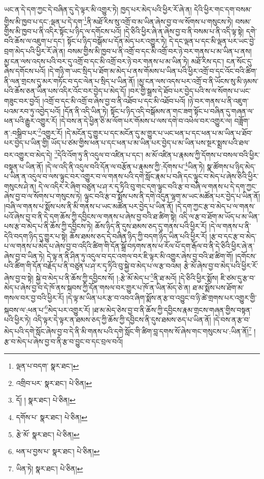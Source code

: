 ཡང་ན་དེ་དག་ཀྱང་དེ་བཞིན་དུ་དེ་ལྟར་མི་འགྱུར་ཏེ། ཁྱད་པར་མེད་པའི་ཕྱིར་རོ་ཞེ་ན། དེའི་ཕྱིར་གང་དག་བསམ་གྱིས་མི་ཁྱབ་པ་དང་:ལྡན་པ་དེ་དག་\footnote{ལྡན་པ་བདག་  སྣར་ཐང་། }ནི་མཐོ་རིས་སུ་འགྲོ་བ་མ་ཡིན་ཞེས་བྱ་བ་ལ་སོགས་པ་གསུངས་ཏེ། བསམ་གྱིས་མི་ཁྱབ་པ་ནི་འདིར་སྟོང་པ་ཉིད་ལ་དགོངས་པའོ། །དེ་ཅིའི་ཕྱིར་ཞེ་ན་ཞེས་བྱ་བ་ནི་བསམ་པ་ནི་འདི་ལྟ་སྟེ། དགེ་བའི་ཆོས་ལ་འཇུག་པ་དང་། སྟོང་པ་ཉིད་བསྒོམ་པ་དོན་མེད་པར་འགྱུར་ཏེ། དེ་དང་ལྡན་པ་དང་མི་ལྡན་པར་ཡང་བྱེ་བྲག་མེད་པའི་ཕྱིར་རོ་ཞེ་ན། བསམ་གྱིས་མི་ཁྱབ་པ་ནི་འགྲོ་བ་དང་མི་འགྲོ་བར་ཉེ་བར་གནས་པ་མ་ཡིན་པ་ནས། མྱ་ངན་ལས་འདས་པའི་བར་དུ་འགྲོ་བ་དང་མི་འགྲོ་བར་ཉེ་བར་གནས་པ་མ་ཡིན་ཏེ། མཐོ་རིས་དང་། ངན་སོང་དུ་ཞེས་དགོངས་པའོ། །དེ་གཉི་ག་ཡང་སྲིད་པ་ཐོག་མ་མེད་པ་ནས་གོམས་པ་ཡིན་པའི་ཕྱིར་འགྲོ་བ་དང་འོང་བའི་ཚིག་ནི་ལན་གྲངས་དུ་མར་གཏོང་བ་དང་ལེན་པ་སྲིད་པ་ཡིན་ནོ། །མྱ་ངན་ལས་འདས་པར་འགྲོ་བ་ནི་ཡོངས་སུ་མི་ཉམས་པའི་ཆོས་ཅན་ཡིན་པས་འདིར་འོང་བར་བྱེད་པ་མེད་དོ། །བར་གྱི་སྒྲས་དེ་ཐོབ་པར་བྱེད་པའི་ས་ལ་སོགས་པ་ཡང་གཟུང་བར་བྱའོ། །འགྲོ་བ་དང་མི་འགྲོ་བ་ཞེས་བྱ་བ་ནི་འཐོབ་པ་དང་མི་འཐོབ་པའོ། །ཉེ་བར་གནས་པ་ནི་འཇུག་པའམ་རབ་ཏུ་འབྱེད་པའོ། །དོན་ནི་འདི་ཡིན་ཏེ། སྟོང་པ་ཉིད་འདི་བསྒོམས་ན་གང་ཟག་སྟོང་པ་བཞིན་དུ་གཞན་ལ་ཕན་པའི་རྒྱུར་འགྱུར་རོ། །དེ་བས་ན་དེ་ཕྱིན་ཅི་མ་ལོག་པར་གོམས་པ་ལས་དགེ་བ་འཕེལ་བར་འགྱུར་ལ། བཟློག་ན་:བསྒྲིབ་པར་\footnote{འགྲིབ་པར་  སྣར་ཐང་།  པེ་ཅིན། }འགྱུར་རོ། །དེ་མངོན་དུ་གྱུར་པ་དང་མངོན་དུ་མ་གྱུར་པ་ཡང་ཕན་པ་དང་ཕན་པ་མ་ཡིན་པ་ཐོབ་པར་བྱེད་པ་ཡིན་གྱི། ཡོད་པ་ཙམ་གྱིས་ཕན་པ་དང་ཕན་པ་མ་ཡིན་པར་བྱེད་པ་མ་ཡིན་པས་སྔར་སྨྲས་པའི་ཐལ་བར་འགྱུར་བ་མེད་དེ། \footnote{དོ། །   སྣར་ཐང་།  པེ་ཅིན། }དེའི་འོག་ཏུ་ནི་འདུལ་བ་འཛིན་པ་དང་། མ་མོ་འཛིན་པ་རྣམས་ཀྱི་དོགས་པ་བསལ་བའི་ཕྱིར་བསྟན་པ་ཡིན་ནོ། །དེ་ལ་འདི་ནི་འདུལ་བའི་དོན་ལ་བརྩོན་པ་རྣམས་ཀྱི་:དོགས་པ་\footnote{དགོས་པ་  སྣར་ཐང་།  པེ་ཅིན། }ཡིན་ཏེ། སྣ་ཚོགས་པ་ཉིད་མེད་པ་ཡིན་ན་འདུལ་བ་ལས་ལྟུང་བར་འགྱུར་བ་ལ་གནས་པའི་དགེ་སློང་རྣམ་པ་བཞི་དང་ལྟུང་བ་མེད་པ་ཞེས་ཅིའི་ཕྱིར་གསུངས་ཤེ་ན། དེ་ལ་འདིར་རེ་ཞིག་བཙུན་པ་ཤ་ར་དྭ་ཏིའི་བུ་གང་དག་ལྟུང་བའི་རྩ་བ་བཞི་ལ་གནས་པ་དེ་དག་ཀྱང་ཞེས་བྱ་བ་ལ་སོགས་པ་གསུངས་ཏེ། ལྟུང་བའི་རྩ་བ་སྨོས་པས་ནི་དགེ་འདུན་ལྷག་མ་ཡང་མཚོན་པར་བྱེད་པ་ཡིན་ནོ། །བཞི་ལ་གནས་པ་སྨོས་པས་ནི་མི་གནས་པ་ཡང་མཚོན་པར་བྱེད་པ་ཡིན་ནོ། །དེ་དག་ཀྱང་རྩ་བ་མེད་པ་ལ་གནས་པའོ་ཞེས་བྱ་བ་ནི་དེ་དག་ཆོས་ཀྱི་དབྱིངས་ལ་གནས་པ་ཞེས་བྱ་བའི་ཐ་ཚིག་སྟེ། འདི་ལ་རྩ་བ་ཐོག་མ་ཡོད་པ་མ་ཡིན་པས་རྩ་བ་མེད་པ་ནི་ཆོས་ཀྱི་དབྱིངས་ཏེ། ཆོས་ཉིད་ནི་དུས་ཐམས་ཅད་དུ་གནས་པའི་ཕྱིར་རོ། །དེ་ལ་གནས་པ་ནི་དེའི་བདག་ཉིད་དུ་གྱུར་པ་སྟེ། ཆོས་ཐམས་ཅད་དེ་བཞིན་ཉིད་ཀྱི་བདག་ཉིད་ཡིན་པའི་ཕྱིར་རོ། །རྩ་བ་དང་རྩ་བ་མེད་པ་ལ་གནས་པ་མེད་པ་ཞེས་བྱ་བ་འདིའི་ཚིག་གི་དོན་སྒྲོ་བཏགས་ནས་ཕ་རོལ་པོ་དག་རྒོལ་བ་ནི་དེ་ཅིའི་ཕྱིར་ཞེ་ན་ཞེས་བྱ་བ་ཡིན་ཏེ། དེ་ལྟ་ན་ནི་ཤིན་ཏུ་འདུལ་བ་དང་འགལ་བར་ཇི་ལྟར་མི་འགྱུར་ཞེས་བྱ་བའི་ཐ་ཚིག་གོ། །དགོངས་པའི་ཚིག་གི་དོན་བརྗོད་པ་ནི་བཙུན་པ་ཤ་ར་དྭ་ཏིའི་བུ་སྐྱེ་བ་མེད་པ་ལ་རྩ་བའམ། རྩེ་མོ་ཞེས་བྱ་བ་མེད་པའི་ཕྱིར་རོ་ཞེས་བྱ་བ་སྟེ། སྐྱེ་བ་མེད་པ་ནི་ཆོས་ཀྱི་དབྱིངས་སོ། །:རྩེ་མོ་མེད་པ་\footnote{རྩེ་མོ་  སྣར་ཐང་།  པེ་ཅིན། }ནི་ཐ་མའོ། །དེ་ཅིའི་ཕྱིར་སྨོས། ཇི་ཙམ་དུ་རྩ་བ་མེད་པ་ཞེས་བྱ་བ་དེ་ཁོ་ནས་སྐབས་ཀྱི་དོན་གསལ་བར་གྱུར་པ་ཁོ་ན་ཡིན་མོད་ཅེ་ན། ཐ་མ་སྨོས་པས་ཐོག་མ་གསལ་བར་བྱ་བའི་ཕྱིར་རོ། །དེ་ལྟ་མ་ཡིན་པར་རྩ་བ་འབའ་ཞིག་སྨོས་ན་རྩ་བ་འབྱུང་བ་ཉི་ཚེ་གྲགས་པར་འགྱུར་གྱི་སྐབས་ལ་:ཕན་པ་\footnote{ཕན་པ་བྱས་པ་  སྣར་ཐང་།  པེ་ཅིན། }མེད་པར་འགྱུར་རོ། །ཐ་མ་མེད་ཅེས་བྱ་བ་ནི་ཆོས་ཀྱི་དབྱིངས་རྣམ་གྲངས་གཞན་གྱིས་བསྟན་པའི་ཕྱིར་ཏེ། འདི་ལྟར་དེ་ལྟར་ན་ཐམས་ཅད་ཀྱི་ཆོས་ཀྱི་དབྱིངས་ནི་དུས་ཐམས་ཅད་པ་ཡིན་ནོ། །དེ་བས་ན་རྩ་བ་མེད་པའི་དགེ་སློང་ཞེས་བྱ་བ་དེ་ནི་མི་གནས་པའི་དགེ་སློང་གི་ཚིག་བླ་དགས་སོ་ཞེས་གང་གསུངས་པ་:ཡིན་ནོ།\footnote{ཡིན་ཏེ།  སྣར་ཐང་།  པེ་ཅིན། } །རྩ་བ་མེད་པ་ཞེས་བྱ་བ་ནི་རྩ་བ་བྱུང་བ་དང་བྲལ་བའོ། 